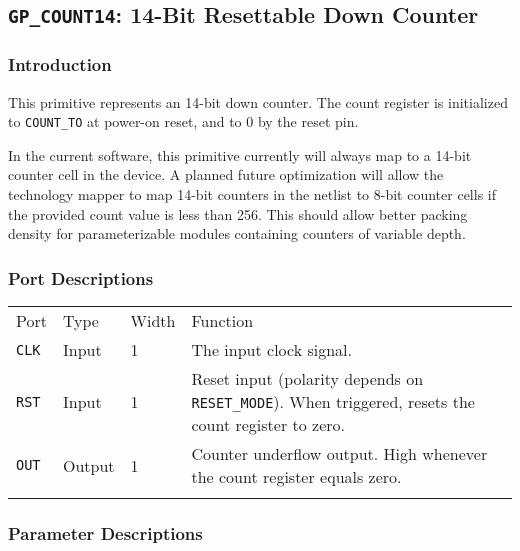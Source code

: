\documentclass[11pt]{article}
\newcommand{\tokenstyle}[1]{\texttt{#1}}
\newcommand{\whenstyle}[1]{{\fontseries{sb}\selectfont#1}}
\newcommand{\thinhline}{\Xhline{1\arrayrulewidth}}
\newcommand{\thickhline}{\Xhline{2.5\arrayrulewidth}}
\begin{document}

\pagebreak
\subsection{\tokenstyle{GP\_COUNT14}: 14-Bit Resettable Down Counter}
\label{gp-count14}

\subsubsection{Introduction}
This primitive represents an 14-bit down counter. The count register is initialized to \tokenstyle{COUNT\_TO} at
power-on reset, and to 0 by the reset pin.

In the current software, this primitive currently will always map to a 14-bit counter cell in the device. A planned
future optimization will allow the technology mapper to map 14-bit counters in the netlist to 8-bit counter cells if
the provided count value is less than 256. This should allow better packing density for parameterizable modules
containing counters of variable depth.

\subsubsection{Port Descriptions}

\begin{tabularx}{\textwidth}{lllX}
\thinhline
\whenstyle{Port} & \whenstyle{Type} & \whenstyle{Width} & \whenstyle{Function} \\
\thickhline
\tokenstyle{CLK} & Input & 1 & The input clock signal. \\
\thinhline
\tokenstyle{RST} & Input & 1 & Reset input (polarity depends on \tokenstyle{RESET\_MODE}). When triggered, resets the count register to zero. \\
\thinhline
\tokenstyle{OUT} & Output & 1 & Counter underflow output. High whenever the count register equals zero. \\
\thinhline
\end{tabularx}

\subsubsection{Parameter Descriptions}
\end{document}
